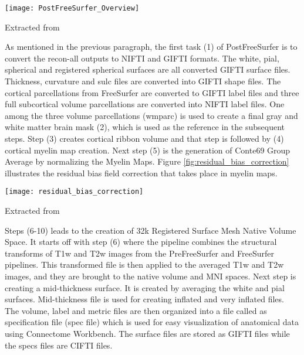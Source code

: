 \begin{center}
  \texttt{[image: PostFreeSurfer\_Overview]}
  \label{fig:postfreesurfer_overview}
  \caption*{Extracted from \cite{Gla13}}
\end{center}

As mentioned in the previous paragraph, the first task (1) of PostFreeSurfer is to convert the recon-all outputs to NIFTI and GIFTI formats. The white, pial, spherical and registered spherical surfaces are all converted GIFTI surface files. Thickness, curvature and sulc files are converted into GIFTI shape files. The cortical parcellations from FreeSurfer are converted to GIFTI label files and three full subcortical volume parcellations are converted into NIFTI label files. One among the three volume parcellations (wmparc) is used to create a final gray and white matter brain mask (2), which is used as the reference in the subsequent steps. Step (3) creates cortical ribbon volume and that step is followed by (4) cortical myelin map creation. Next step (5) is the generation of Conte69 Group Average by normalizing the Myelin Maps. Figure \ref{fig:residual_bias_correction} illustrates the residual bias field correction that takes place in myelin maps.

\vspace{0.2cm}%
\begin{center}
  \texttt{[image: residual\_bias\_correction]}
  \label{fig:residual_bias_correction}
  \caption*{Extracted from \cite{Gla13}}
\end{center}

Steps (6-10) leads to the creation of 32k Registered Surface Mesh Native Volume Space. It starts off with step (6) where the pipeline combines the structural transforms of T1w and T2w images from the PreFreeSurfer and FreeSurfer pipelines. This transformed file is then applied to the averaged T1w and T2w images, and they are brought to the native volume and MNI spaces. Next step is creating a mid-thickness surface. It is created by averaging the white and pial surfaces. Mid-thickness file is used for creating inflated and very inflated files. The volume, label and metric files are then organized into a file called as specification file (spec file) which is used for easy visualization of anatomical data using Connectome Workbench. The surface files are stored as GIFTI files while the specs files are CIFTI files.


